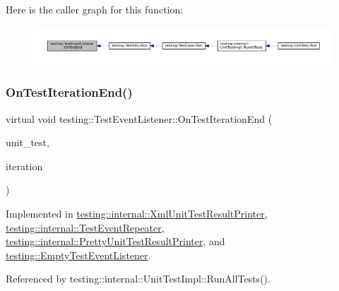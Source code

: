 Here is the caller graph for this function\+:
\nopagebreak
\begin{figure}[H]
\begin{center}
\leavevmode
\includegraphics[width=350pt]{classtesting_1_1TestEventListener_abb1c44525ef038500608b5dc2f17099b_icgraph}
\end{center}
\end{figure}
\mbox{\label{classtesting_1_1TestEventListener_a550fdb3e55726e4cefa09f5697941425}} 
\subsubsection{\texorpdfstring{On\+Test\+Iteration\+End()}{OnTestIterationEnd()}}
{\footnotesize\ttfamily virtual void testing\+::\+Test\+Event\+Listener\+::\+On\+Test\+Iteration\+End (\begin{DoxyParamCaption}\item[{const \hyperlink{classtesting_1_1UnitTest}{Unit\+Test} \&}]{unit\+\_\+test,  }\item[{int}]{iteration }\end{DoxyParamCaption})\hspace{0.3cm}{\ttfamily [pure virtual]}}



Implemented in \hyperlink{classtesting_1_1internal_1_1XmlUnitTestResultPrinter_a2ae986dd2f4f2aed31cc6f3bc8c56898}{testing\+::internal\+::\+Xml\+Unit\+Test\+Result\+Printer}, \hyperlink{classtesting_1_1internal_1_1TestEventRepeater_a94253e3c11753328e8a031f39352708f}{testing\+::internal\+::\+Test\+Event\+Repeater}, \hyperlink{classtesting_1_1internal_1_1PrettyUnitTestResultPrinter_ac29b30216023baddda04ef5889f484ff}{testing\+::internal\+::\+Pretty\+Unit\+Test\+Result\+Printer}, and \hyperlink{classtesting_1_1EmptyTestEventListener_a2253e5a18b3cf7bccd349567a252209d}{testing\+::\+Empty\+Test\+Event\+Listener}.



Referenced by testing\+::internal\+::\+Unit\+Test\+Impl\+::\+Run\+All\+Tests().

